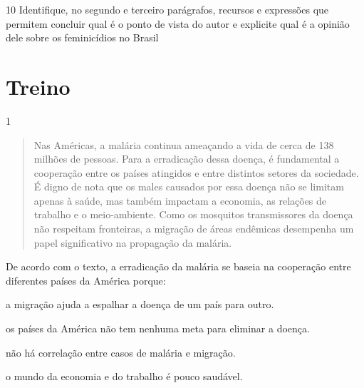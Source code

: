 \num{10} Identifique, no segundo e terceiro parágrafos, recursos e expressões que permitem 
concluir qual é o ponto de vista do autor e explicite qual é a opinião dele sobre os feminicídios 
no Brasil   


\section{Treino}

\num{1}

\begin{quote}
Nas Américas, a malária continua ameaçando a vida de cerca de 138 milhões de pessoas.
Para a erradicação dessa doença, é fundamental a cooperação entre os países atingidos e 
entre distintos setores da sociedade. É digno de nota que os males causados por essa doença
não se limitam apenas à saúde, mas também impactam a economia, as relações de trabalho e 
o meio-ambiente. Como os mosquitos transmissores da doença não respeitam fronteiras, a migração
de áreas endêmicas desempenha um papel significativo na propagação da malária. 
\end{quote}


De acordo com o texto, a erradicação da malária se baseia na cooperação entre diferentes países 
da América porque:

\begin{escolha}

  \item a migração ajuda a espalhar a doença de um país para outro.

  \item os países da América não tem nenhuma meta para eliminar a doença.

  \item não há correlação entre casos de malária e migração. 

  \item o mundo da economia e do trabalho é pouco saudável.

\end{escolha}

